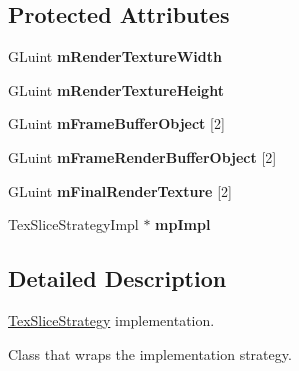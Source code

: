 \subsection*{\-Protected \-Attributes}
\begin{DoxyCompactItemize}
\item 
\hypertarget{class_verdi_1_1_tex_slice_strategy_ac1d85481ef6b70e7057ceb92e6146f75}{\-G\-Luint {\bfseries m\-Render\-Texture\-Width}}\label{class_verdi_1_1_tex_slice_strategy_ac1d85481ef6b70e7057ceb92e6146f75}

\item 
\hypertarget{class_verdi_1_1_tex_slice_strategy_add1e6cbae5c3db86f4e85fa470c66643}{\-G\-Luint {\bfseries m\-Render\-Texture\-Height}}\label{class_verdi_1_1_tex_slice_strategy_add1e6cbae5c3db86f4e85fa470c66643}

\item 
\hypertarget{class_verdi_1_1_tex_slice_strategy_a8ae5061a07bd61c7ee5566439db126fa}{\-G\-Luint {\bfseries m\-Frame\-Buffer\-Object} \mbox{[}2\mbox{]}}\label{class_verdi_1_1_tex_slice_strategy_a8ae5061a07bd61c7ee5566439db126fa}

\item 
\hypertarget{class_verdi_1_1_tex_slice_strategy_abe91460d8b10930c3f7adde27a4ac9dc}{\-G\-Luint {\bfseries m\-Frame\-Render\-Buffer\-Object} \mbox{[}2\mbox{]}}\label{class_verdi_1_1_tex_slice_strategy_abe91460d8b10930c3f7adde27a4ac9dc}

\item 
\hypertarget{class_verdi_1_1_tex_slice_strategy_a8f1b115785b1ef04137f5a0faeadb9e8}{\-G\-Luint {\bfseries m\-Final\-Render\-Texture} \mbox{[}2\mbox{]}}\label{class_verdi_1_1_tex_slice_strategy_a8f1b115785b1ef04137f5a0faeadb9e8}

\item 
\hypertarget{class_verdi_1_1_tex_slice_strategy_aafb9103d05fa2a33fd0d197693f8ff85}{\-Tex\-Slice\-Strategy\-Impl $\ast$ {\bfseries mp\-Impl}}\label{class_verdi_1_1_tex_slice_strategy_aafb9103d05fa2a33fd0d197693f8ff85}

\end{DoxyCompactItemize}


\subsection{\-Detailed \-Description}
\hyperlink{class_verdi_1_1_tex_slice_strategy}{\-Tex\-Slice\-Strategy} implementation.

\-Class that wraps the implementation strategy. 

